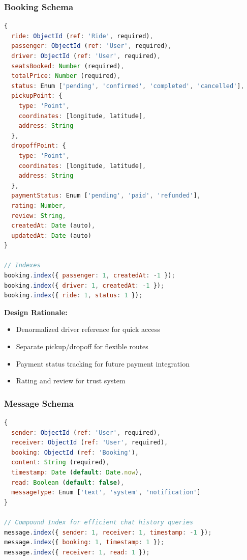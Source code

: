 \documentclass[12pt,a4paper]{article}
\begin{document}
\subsubsection{Booking Schema}
\begin{lstlisting}[language=JavaScript, caption=Booking Model Structure]
{
  ride: ObjectId (ref: 'Ride', required),
  passenger: ObjectId (ref: 'User', required),
  driver: ObjectId (ref: 'User', required),
  seatsBooked: Number (required),
  totalPrice: Number (required),
  status: Enum ['pending', 'confirmed', 'completed', 'cancelled'],
  pickupPoint: {
    type: 'Point',
    coordinates: [longitude, latitude],
    address: String
  },
  dropoffPoint: {
    type: 'Point',
    coordinates: [longitude, latitude],
    address: String
  },
  paymentStatus: Enum ['pending', 'paid', 'refunded'],
  rating: Number,
  review: String,
  createdAt: Date (auto),
  updatedAt: Date (auto)
}

// Indexes
booking.index({ passenger: 1, createdAt: -1 });
booking.index({ driver: 1, createdAt: -1 });
booking.index({ ride: 1, status: 1 });
\end{lstlisting}

\textbf{Design Rationale:}
\begin{itemize}
    \item Denormalized driver reference for quick access
    \item Separate pickup/dropoff for flexible routes
    \item Payment status tracking for future payment integration
    \item Rating and review for trust system
\end{itemize}

\subsubsection{Message Schema}
\begin{lstlisting}[language=JavaScript, caption=Message Model Structure]
{
  sender: ObjectId (ref: 'User', required),
  receiver: ObjectId (ref: 'User', required),
  booking: ObjectId (ref: 'Booking'),
  content: String (required),
  timestamp: Date (default: Date.now),
  read: Boolean (default: false),
  messageType: Enum ['text', 'system', 'notification']
}

// Compound Index for efficient chat history queries
message.index({ sender: 1, receiver: 1, timestamp: -1 });
message.index({ booking: 1, timestamp: 1 });
message.index({ receiver: 1, read: 1 });
\end{lstlisting}
\end{document}
